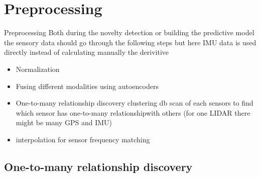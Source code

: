 \section{Preprocessing}
    \begin{frame}{Preprocessing}
        Both during the novelty detection or building the predictive model the sensory data should go through the following steps but here IMU data is used directly instead of calculating manually the derivitive
        \begin{itemize}
            \item Normalization
            \item Fusing different modalities using autoencoders
            \item One-to-many relationship discovery clustering db scan of each sensors to find which sensor has one-to-many relationshipwith others (for one LIDAR there might be many GPS and IMU)
            \item interpolation for sensor frequency matching
        \end{itemize}
    
    \end{frame}
    
    \subsection{One-to-many relationship discovery}
        